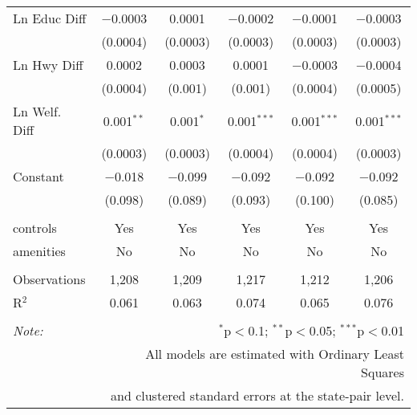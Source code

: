 \begin{table}[!htbp]
\begin{tabular}{@{\extracolsep{5pt}}lccccc}
  Ln Educ Diff & $-$0.0003 & 0.0001 & $-$0.0002 & $-$0.0001 & $-$0.0003 \\ 
  & (0.0004) & (0.0003) & (0.0003) & (0.0003) & (0.0003) \\ 
  Ln Hwy Diff & 0.0002 & 0.0003 & 0.0001 & $-$0.0003 & $-$0.0004 \\ 
  & (0.0004) & (0.001) & (0.001) & (0.0004) & (0.0005) \\ 
  Ln Welf. Diff & 0.001$^{**}$ & 0.001$^{*}$ & 0.001$^{***}$ & 0.001$^{***}$ & 0.001$^{***}$ \\ 
  & (0.0003) & (0.0003) & (0.0004) & (0.0004) & (0.0003) \\ 
  Constant & $-$0.018 & $-$0.099 & $-$0.092 & $-$0.092 & $-$0.092 \\ 
  & (0.098) & (0.089) & (0.093) & (0.100) & (0.085) \\ 
 \hline \\[-1.8ex] 
controls & Yes & Yes & Yes & Yes & Yes \\ 
amenities & No & No & No & No & No \\ 
\hline \\[-1.8ex] 
Observations & 1,208 & 1,209 & 1,217 & 1,212 & 1,206 \\ 
R$^{2}$ & 0.061 & 0.063 & 0.074 & 0.065 & 0.076 \\ 
\hline 
\hline \\[-1.8ex] 
\textit{Note:}  & \multicolumn{5}{r}{$^{*}$p$<$0.1; $^{**}$p$<$0.05; $^{***}$p$<$0.01} \\ 
 & \multicolumn{5}{r}{All models are estimated with Ordinary Least Squares} \\ 
 & \multicolumn{5}{r}{and clustered standard errors at the state-pair level.} \\ 
\end{tabular} 
\end{table} 
